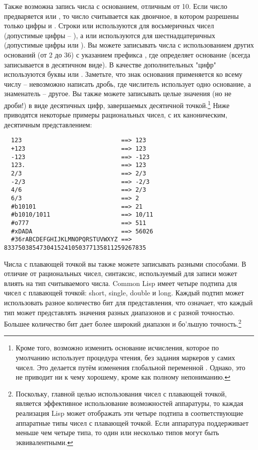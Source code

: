 Также возможна запись числа с основанием, отличным от 10.  Если число предваряется
 или , то число считывается как двоичное, в котором разрешены только
цифры  и .  Строки  или  используются для восьмеричных
чисел (допустимые цифры -- ), а  или  используются для
шестнадцатеричных (допустимые цифры  или ).  Вы можете записывать
числа с использованием других оснований (от 2 до 36) с указанием префикса , где
 определяет основание (всегда записывается в десятичном виде).  В качестве
дополнительных "цифр" используются буквы  или .  Заметьте, что знак
основания применяется ко всему числу -- невозможно написать дробь, где числитель
использует одно основание, а знаменатель -- другое.  Вы также можете записывать целые
значения (но не дроби!) в виде десятичных цифр, завершаемых десятичной
точкой.\footnote{Кроме того, возможно изменить основание исчисления, которое по умолчанию
  использует процедура чтения, без задания маркеров у самих чисел. Это делается путём
  изменения глобальной переменной .  Однако, это не приводит ни к чему
  хорошему, кроме как полному непониманию.}  Ниже приводятся некоторые примеры
рациональных чисел, с их каноническим, десятичным представлением:

\begin{verbatim}
  123                            ==> 123
  +123                           ==> 123
  -123                           ==> -123
  123.                           ==> 123
  2/3                            ==> 2/3
  -2/3                           ==> -2/3
  4/6                            ==> 2/3
  6/3                            ==> 2
  #b10101                        ==> 21
  #b1010/1011                    ==> 10/11
  #o777                          ==> 511
  #xDADA                         ==> 56026
  #36rABCDEFGHIJKLMNOPQRSTUVWXYZ ==> 8337503854730415241050377135811259267835
\end{verbatim}

Числа с плавающей точкой вы также можете записывать разными способами.  В отличие от
рациональных чисел, синтаксис, используемый для записи может влиять на тип считываемого
числа.  Common Lisp имеет четыре подтипа для чисел с плавающей точкой: short, single,
double и long.  Каждый подтип может использовать разное количество бит для представления,
что означает, что каждый тип может представлять значения разных диапазонов и с разной
точностью.  Большее количество бит дает более широкий диапазон и бо'льшую
точность.\footnote{Поскольку, главной целью использования чисел с плавающей точкой,
  является эффективное использование возможностей аппаратуры, то каждая реализация Lisp
  может отображать эти четыре подтипа в соответствующие аппаратные типы чисел с плавающей
  точкой.  Если аппаратура поддерживает меньше чем четыре типа, то один или несколько
  типов могут быть эквивалентными.}

